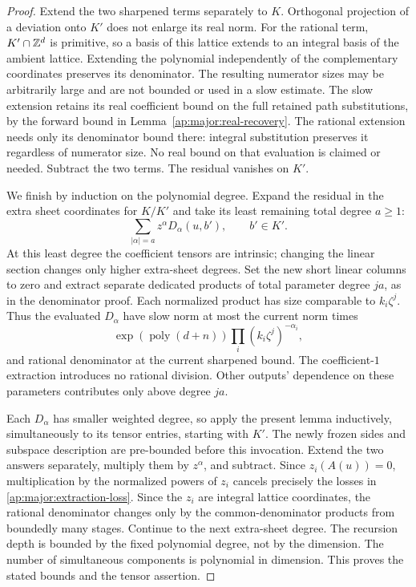 \begin{proof}
Extend the two sharpened terms separately to $K$.  Orthogonal
projection of a deviation onto $K'$ does not enlarge its real norm.
For the rational term, $K'\cap\mathbb Z^d$ is primitive, so a basis of
this lattice extends to an integral basis of the ambient lattice.
Extending the polynomial independently of the complementary
coordinates preserves its denominator.  The resulting numerator
sizes may be arbitrarily large and are not bounded or used in a
slow estimate.  The slow extension retains its real coefficient
bound on the full retained path substitutions, by the forward bound
in Lemma~\ref{ap:major:real-recovery}.  The rational extension needs
only its denominator bound there: integral substitution preserves
it regardless of numerator size.  No real bound on that evaluation
is claimed or needed.  Subtract the two terms.  The
residual vanishes on $K'$.

We finish by induction on the polynomial degree.  Expand the
residual in the extra sheet coordinates for $K/K'$ and take its
least remaining total degree $a\ge1$:
\[
                     \sum_{|\alpha|=a} z^\alpha D_\alpha(u,b'),
                     \qquad b'\in K'.
\]
At this least degree the coefficient tensors are intrinsic; changing
the linear section changes only higher extra-sheet degrees.  Set
the new short linear columns to zero and extract separate dedicated
products of total parameter degree $ja$, as in the denominator
proof.  Each normalized product has size comparable to $k_i\zeta^j$.
Thus the evaluated $D_\alpha$ have slow norm at most the current
norm times
\begin{equation}\label{ap:major:extraction-loss}
        \exp(\operatorname{poly}(d+n))
                      \prod_i(k_i\zeta^j)^{-\alpha_i},
\end{equation}
and rational denominator at the current sharpened bound.  The
coefficient-$1$ extraction introduces no rational division.  Other
outputs' dependence on these parameters contributes only above
degree $ja$.

Each $D_\alpha$ has smaller weighted degree, so apply the present
lemma inductively, simultaneously to its tensor entries, starting
with $K'$.  The newly frozen sides and subspace description are
pre-bounded before this invocation.  Extend the two answers
separately, multiply them by $z^\alpha$, and subtract.  Since
$z_i(A(u))=0$, multiplication by the normalized powers of $z_i$
cancels precisely the losses in \eqref{ap:major:extraction-loss}.
Since the $z_i$ are integral lattice coordinates, the rational
denominator changes only by the common-denominator products from
boundedly many stages.  Continue to the next extra-sheet degree.
The recursion depth is bounded by the fixed polynomial degree, not
by the dimension.  The number of simultaneous components is
polynomial in dimension.  This proves the stated bounds and the
tensor assertion.
\end{proof}

